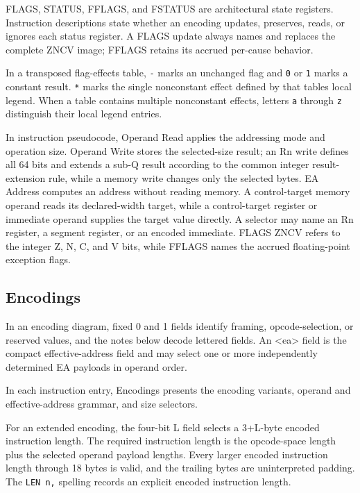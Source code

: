 FLAGS, STATUS, FFLAGS, and FSTATUS are architectural state registers. Instruction descriptions state whether an
encoding updates, preserves, reads, or ignores each status register. A FLAGS update always names and replaces the
complete ZNCV image; FFLAGS retains its accrued per-cause behavior.

In a transposed flag-effects table, \texttt{-} marks an unchanged flag and \texttt{0} or \texttt{1} marks a
constant result. \texttt{*} marks the single nonconstant effect defined by that table\textquotesingle{}s local legend. When a table
contains multiple nonconstant effects, letters \texttt{a} through \texttt{z} distinguish their local legend entries.

In instruction pseudocode, Operand Read applies the addressing mode and operation size. Operand Write stores the
selected-size result; an Rn write defines all 64 bits and extends a sub-Q result according to the common integer
result-extension rule, while a memory write changes only the selected bytes. EA Address
computes an address without reading memory. A control-target memory operand reads its declared-width target, while a
control-target register or immediate operand supplies the target value directly. A selector may name an Rn register, a
segment register, or an encoded immediate. FLAGS ZNCV refers to the integer Z, N, C, and V bits, while FFLAGS names
the accrued floating-point exception flags.

\subsection*{Encodings}
In an encoding diagram, fixed 0 and 1 fields identify framing, opcode-selection, or reserved values, and the notes
below decode lettered fields. An <ea> field is the compact effective-address field and may select one or more
independently determined EA payloads in operand order.

In each instruction entry, Encodings presents the encoding variants, operand and
effective-address grammar, and size selectors.

For an extended encoding, the four-bit L field selects a 3+L-byte encoded instruction length. The required
instruction length is the opcode-space length plus the selected operand payload lengths. Every larger encoded
instruction length through 18 bytes is valid, and the trailing bytes are uninterpreted padding. The
\texttt{LEN n,} spelling records an explicit encoded instruction length.
\endgroup
\clearpage
